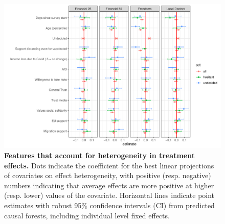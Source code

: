 \documentclass[12pt]{article}
\begin{document}
\begin{figure}
	\centering
	\includegraphics[width=1\linewidth]{figures/figure_9.pdf}
	\caption{\textbf{Features that account for heterogeneity in treatment effects.} Dots indicate the coefficient for the best linear projections of covariates on effect heterogeneity, with positive (resp. negative) numbers indicating that average effects are more positive at higher (resp. lower) values of the covariate. Horizontal lines indicate point estimates with robust 95\% confidence intervals (CI) from predicted causal forests, including individual level fixed effects. }
\end{figure}

\end{document}
